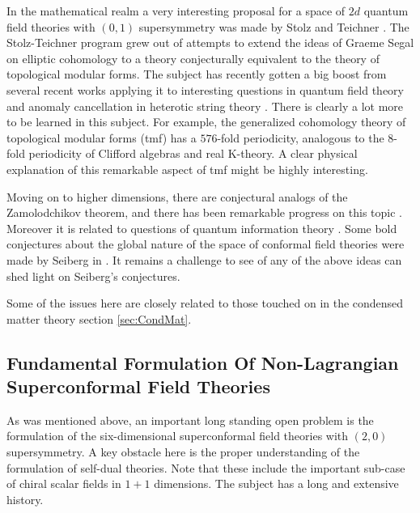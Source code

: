 \documentclass[12pt]{article}
\begin{document}
 In the mathematical realm
a very interesting proposal for a space of $2d$ quantum field theories
with $(0,1)$ supersymmetry was made by Stolz and Teichner \cite{StolzTeichner1,Stolz:2011zj}.
The Stolz-Teichner program grew out of attempts to extend the ideas of Graeme Segal
on elliptic cohomology to a theory conjecturally equivalent to the theory of
topological modular forms. The subject has recently gotten a big boost
from several recent works applying it to interesting questions in
quantum field theory \cite{Gaiotto:2018ypj,Gaiotto:2019asa,Gaiotto:2019gef}
and anomaly cancellation in heterotic string theory \cite{Tachikawa:2021mvw,Tachikawa:2021mby,Yonekura:2022reu}. There is clearly a lot more to be learned in this subject. For example, the
generalized cohomology theory of topological modular forms (tmf) has a $576$-fold periodicity,
analogous to the   $8$-fold periodicity of Clifford algebras and real K-theory.
A clear physical explanation of this remarkable aspect of tmf might be highly interesting.





Moving on to higher dimensions, there are conjectural analogs of
the Zamolodchikov theorem, and there has been remarkable progress
on this topic \cite{Komargodski:2011vj,Elvang:2012st}. Moreover
it is related to questions of quantum information theory
\cite{Casini:2006es,Casini:2012ei,Casini:2015woa,Casini:2016fgb,Casini:2017vbe}.
Some bold conjectures about the global nature of the
space of conformal field theories were made by Seiberg in \cite{SeibergConjecture}. It remains
a challenge to see of any of the above ideas can shed light on Seiberg's
conjectures.



Some of the issues here are closely related to those touched on in the
condensed matter theory section \ref{sec:CondMat}.




\subsection{Fundamental Formulation Of Non-Lagrangian Superconformal Field Theories}

As was mentioned above, an important long standing open problem is the formulation of
the  six-dimensional superconformal field theories with $(2,0)$ supersymmetry. A key obstacle
here is the proper understanding of the formulation of self-dual theories. Note that these
include the important sub-case of chiral scalar fields in $1+1$ dimensions. The subject
has a long and extensive history.
\end{document}
